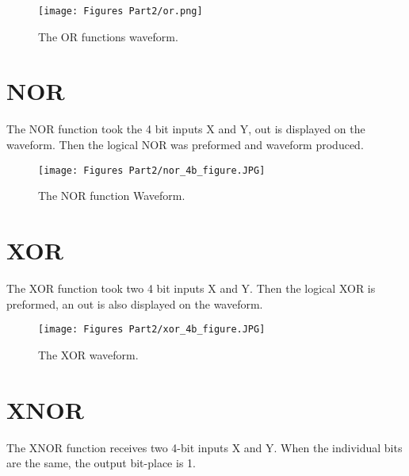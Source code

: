 \documentclass[
	letterpaper, %
	10pt, %
]{CSUniSchoolLabReport}
\begin{document}
\begin{figure}[H] %
	\texttt{[image: Figures Part2/or.png]} %
	\caption{The OR functions waveform.}
\end{figure}


\section{NOR}
The NOR function took the 4 bit inputs X and Y, out is displayed on the waveform. Then the logical NOR was preformed and waveform produced.

\begin{figure}[H] %
	\texttt{[image: Figures Part2/nor\_4b\_figure.JPG]} %
	\caption{The NOR function Waveform.}
\end{figure}


\section{XOR}
The XOR function took two 4 bit inputs X and Y. Then the logical XOR is preformed, an out is also displayed on the waveform.

\begin{figure}[H] %
	\texttt{[image: Figures Part2/xor\_4b\_figure.JPG]} %
	\caption{The XOR waveform.}
\end{figure}



\section{XNOR}
The XNOR function receives two 4-bit inputs X and Y. When the individual bits are the same, the output bit-place is 1.
\end{document}
